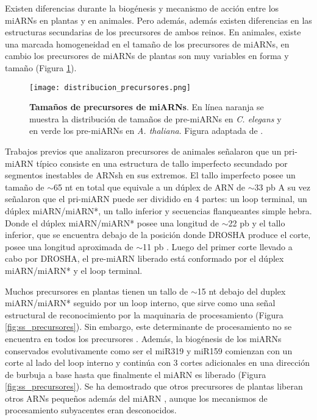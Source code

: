 Existen diferencias durante la biogénesis y mecanismo de acción entre los miARNs en plantas y en animales.
Pero además, además existen diferencias en las estructuras secundarias de los precursores de ambos reinos.
En animales, existe una marcada homogeneidad en el tamaño de los precursores de miARNs, en cambio los precursores de miARNs de plantas son muy variables en forma y tamaño (Figura \ref{fig:distribucion_precursores}). 

\begin{figure}[htbp!] 
	\centering    
	\texttt{[image: distribucion\_precursores.png]}
	\caption[Tamaños de precursores de miARNs]{
		\textbf{Tamaños de precursores de miARNs}.
		En línea naranja se muestra la distribución de tamaños de pre-miARNs en \textit{C. elegans} y en verde los pre-miARNs en \textit{A. thaliana}.
        Figura adaptada de \citep{Bologna2009}.
	}
	\label{fig:distribucion_precursores}
\end{figure}

Trabajos previos que analizaron precursores de animales señalaron que un pri-miARN típico consiste en una estructura de tallo imperfecto secundado por segmentos inestables de ARNsh en sus extremos.
El tallo imperfecto posee un tamaño de $\sim$65 nt en total que equivale a un dúplex de ARN de $\sim$33 pb  \citep{pmid16751099}
A su vez señalaron que el pri-miARN puede ser dividido en 4 partes: un loop terminal, un dúplex miARN/miARN*, un tallo inferior y secuencias flanqueantes simple hebra. 
Donde el dúplex miARN/miARN* posee una longitud de $\sim$22 pb y el tallo inferior, que se encuentra debajo de la posición donde DROSHA produce el corte, posee una longitud aproximada de $\sim$11 pb \citep{pmid16751099}.
Luego del primer corte llevado a cabo por DROSHA, el pre-miARN liberado está conformado por el dúplex miARN/miARN* y el loop terminal.

Muchos precursores en plantas tienen un tallo de $\sim$15 nt debajo del duplex miARN/miARN* seguido por un loop interno, que sirve como una señal estructural de reconocimiento por la maquinaria de procesamiento \citep{pmid17369351,pmid16751099,Mateos2010,pmid20015654} (Figura \ref{fig:ss_precursores}).
Sin embargo, este determinante de procesamiento no se encuentra en todos los precursores \citep{Mateos2010}.
Además, la biogénesis de los miARNs conservados evolutivamente como ser el miR319 y miR159 comienzan con un corte al lado del loop interno y continúa con 3 cortes adicionales en una dirección de burbuja a base hasta que finalmente el miARN es liberado \citep{Bologna2013,pmid19850910} (Figura \ref{fig:ss_precursores}).
Se ha demostrado que otros precursores de plantas liberan otros ARNs pequeños además del miARN \citep{pmid15314213,pmid20696037}, aunque los mecanismos de procesamiento subyacentes eran desconocidos.

